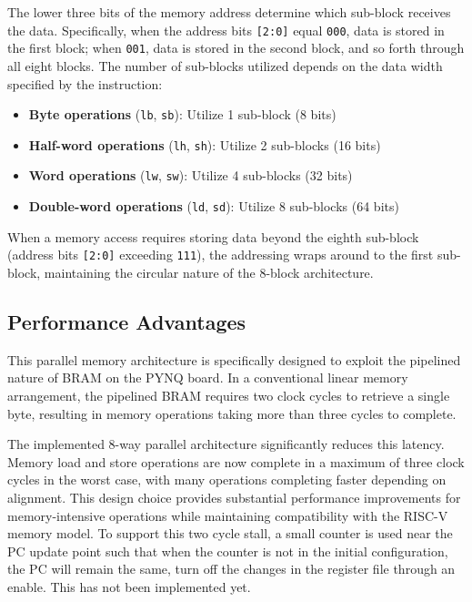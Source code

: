 \documentclass{article}
\begin{document}
The lower three bits of the memory address determine which sub-block receives the data. Specifically, when the address bits \texttt{[2:0]} equal \texttt{000}, data is stored in the first block; when \texttt{001}, data is stored in the second block, and so forth through all eight blocks. The number of sub-blocks utilized depends on the data width specified by the instruction:

\begin{itemize}
    \item \textbf{Byte operations} (\texttt{lb}, \texttt{sb}): Utilize 1 sub-block (8 bits)
    \item \textbf{Half-word operations} (\texttt{lh}, \texttt{sh}): Utilize 2 sub-blocks (16 bits)
    \item \textbf{Word operations} (\texttt{lw}, \texttt{sw}): Utilize 4 sub-blocks (32 bits)
    \item \textbf{Double-word operations} (\texttt{ld}, \texttt{sd}): Utilize 8 sub-blocks (64 bits)
\end{itemize}

When a memory access requires storing data beyond the eighth sub-block (address bits \texttt{[2:0]} exceeding \texttt{111}), the addressing wraps around to the first sub-block, maintaining the circular nature of the 8-block architecture.

\subsection*{Performance Advantages}

This parallel memory architecture is specifically designed to exploit the pipelined nature of BRAM on the PYNQ board. In a conventional linear memory arrangement, the pipelined BRAM requires two clock cycles to retrieve a single byte, resulting in memory operations taking more than three cycles to complete.

The implemented 8-way parallel architecture significantly reduces this latency. Memory load and store operations are now complete in a maximum of three clock cycles in the worst case, with many operations completing faster depending on alignment. This design choice provides substantial performance improvements for memory-intensive operations while maintaining compatibility with the RISC-V memory model. To support this two cycle stall, a small counter is used near the PC update point such that when the counter is not in the initial configuration, the PC will remain the same, turn off the changes in the register file through an enable. This has not been implemented yet.
\end{document}
